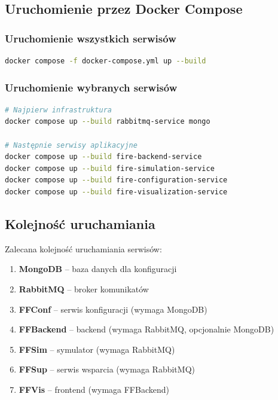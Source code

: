 \documentclass[11pt,a4paper]{article}
\begin{document}
\subsection{Uruchomienie przez Docker Compose}

\subsubsection{Uruchomienie wszystkich serwisów}

\begin{lstlisting}[language=bash, basicstyle=\small]
docker compose -f docker-compose.yml up --build
\end{lstlisting}

\subsubsection{Uruchomienie wybranych serwisów}

\begin{lstlisting}[language=bash, basicstyle=\small]
# Najpierw infrastruktura
docker compose up --build rabbitmq-service mongo

# Następnie serwisy aplikacyjne
docker compose up --build fire-backend-service
docker compose up --build fire-simulation-service
docker compose up --build fire-configuration-service
docker compose up --build fire-visualization-service
\end{lstlisting}

\subsection{Kolejność uruchamiania}

Zalecana kolejność uruchamiania serwisów:

\begin{enumerate}
    \item \textbf{MongoDB} -- baza danych dla konfiguracji
    \item \textbf{RabbitMQ} -- broker komunikatów
    \item \textbf{FFConf} -- serwis konfiguracji (wymaga MongoDB)
    \item \textbf{FFBackend} -- backend (wymaga RabbitMQ, opcjonalnie MongoDB)
    \item \textbf{FFSim} -- symulator (wymaga RabbitMQ)
    \item \textbf{FFSup} -- serwis wsparcia (wymaga RabbitMQ)
    \item \textbf{FFVis} -- frontend (wymaga FFBackend)
\end{enumerate}
\end{document}
